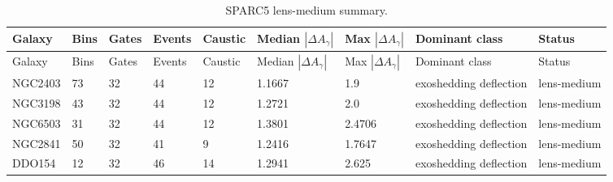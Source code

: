 \scriptsize
\begin{longtable}{p{}p{}p{}p{}p{}p{}p{}p{}p{}}
\caption{SPARC5 lens-medium summary.}\label{tab:manual-lensing-sparc5-summary}\\
\toprule
Galaxy & Bins & Gates & Events & Caustic & Median $|\Delta A_\gamma|$ & Max $|\Delta A_\gamma|$ & Dominant class & Status\\
\midrule
\endfirsthead
\toprule
Galaxy & Bins & Gates & Events & Caustic & Median $|\Delta A_\gamma|$ & Max $|\Delta A_\gamma|$ & Dominant class & Status\\
\midrule
\endhead
NGC2403 & 73 & 32 & 44 & 12 & 1.1667 & 1.9 & exoshedding deflection & lens-medium\\
NGC3198 & 43 & 32 & 44 & 12 & 1.2721 & 2.0 & exoshedding deflection & lens-medium\\
NGC6503 & 31 & 32 & 44 & 12 & 1.3801 & 2.4706 & exoshedding deflection & lens-medium\\
NGC2841 & 50 & 32 & 41 & 9 & 1.2416 & 1.7647 & exoshedding deflection & lens-medium\\
DDO154 & 12 & 32 & 46 & 14 & 1.2941 & 2.625 & exoshedding deflection & lens-medium\\
\bottomrule
\end{longtable}
\normalsize
